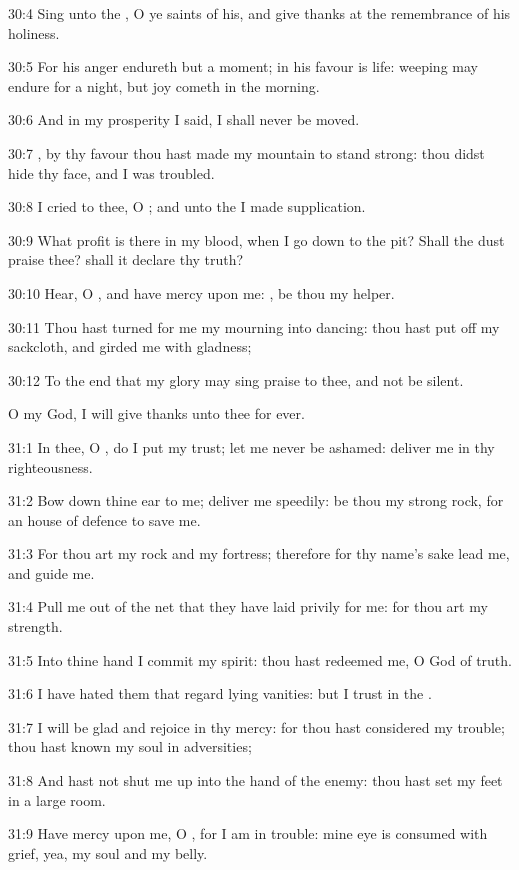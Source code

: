 30:4 Sing unto the \LORD, O ye saints of his, and give thanks at the
remembrance of his holiness.

30:5 For his anger endureth but a moment; in his favour is life:
weeping may endure for a night, but joy cometh in the morning.

30:6 And in my prosperity I said, I shall never be moved.

30:7 \LORD, by thy favour thou hast made my mountain to stand strong:
thou didst hide thy face, and I was troubled.

30:8 I cried to thee, O \LORD; and unto the \LORD I made supplication.

30:9 What profit is there in my blood, when I go down to the pit?
Shall the dust praise thee? shall it declare thy truth?

30:10 Hear, O \LORD, and have mercy upon me: \LORD, be thou my helper.

30:11 Thou hast turned for me my mourning into dancing: thou hast put
off my sackcloth, and girded me with gladness;

30:12 To the end that my glory may sing praise to thee, and not be
silent.

O \LORD my God, I will give thanks unto thee for ever.



31:1 In thee, O \LORD, do I put my trust; let me never be ashamed:
deliver me in thy righteousness.

31:2 Bow down thine ear to me; deliver me speedily: be thou my strong
rock, for an house of defence to save me.

31:3 For thou art my rock and my fortress; therefore for thy name's
sake lead me, and guide me.

31:4 Pull me out of the net that they have laid privily for me: for
thou art my strength.

31:5 Into thine hand I commit my spirit: thou hast redeemed me, O \LORD
God of truth.

31:6 I have hated them that regard lying vanities: but I trust in the
\LORD.

31:7 I will be glad and rejoice in thy mercy: for thou hast considered
my trouble; thou hast known my soul in adversities;

31:8 And hast not shut me up into the hand of the enemy: thou hast set
my feet in a large room.

31:9 Have mercy upon me, O \LORD, for I am in trouble: mine eye is
consumed with grief, yea, my soul and my belly.


